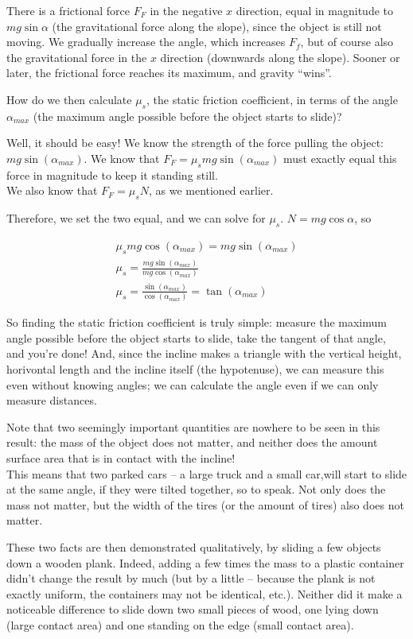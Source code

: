 \documentclass[12pt,a4paper]{report}
\begin{document}
There is a frictional force $F_F$ in the negative $x$ direction, equal in magnitude to $m g \sin \alpha$ (the gravitational force along the slope), since the object is still not moving. We gradually increase the angle, which increases $F_f$, but of course also the gravitational force in the $x$ direction (downwards along the slope). Sooner or later, the frictional force reaches its maximum, and gravity ``wins''.

How do we then calculate $\mu_s$, the static friction coefficient, in terms of the angle $\alpha_{max}$ (the maximum angle possible before the object starts to slide)?

Well, it should be easy! We know the strength of the force pulling the object: $m g \sin (\alpha_{max})$. We know that $F_F = \mu_s m g \sin (\alpha_{max})$ must exactly equal this force in magnitude to keep it standing still.\\
We also know that $F_F = \mu_s N$, as we mentioned earlier.

Therefore, we set the two equal, and we can solve for $\mu_s$. $N = m g \cos \alpha$, so

\begin{align}
\mu_s m g \cos (\alpha_{max}) = m g \sin(\alpha_{max})\\
\mu_s = \frac{m g \sin(\alpha_{max})}{m g \cos (\alpha_{max})}\\
\mu_s = \frac{\sin(\alpha_{max})}{\cos (\alpha_{max})} = \tan(\alpha_{max})
\end{align}

So finding the static friction coefficient is truly simple: measure the maximum angle possible before the object starts to slide, take the tangent of that angle, and you're done! And, since the incline makes a triangle with the vertical height, horivontal length and the incline itself (the hypotenuse), we can measure this even without knowing angles; we can calculate the angle even if we can only measure distances.

Note that two seemingly important quantities are nowhere to be seen in this result: the mass of the object does not matter, and neither does the amount surface area that is in contact with the incline!\\
This means that two parked cars -- a large truck and a small car,will start to slide at the same angle, if they were tilted together, so to speak. Not only does the mass not matter, but the width of the tires (or the amount of tires) also does not matter.

These two facts are then demonstrated qualitatively, by sliding a few objects down a wooden plank. Indeed, adding a few times the mass to a plastic container didn't change the result by much (but by a little -- because the plank is not exactly uniform, the containers may not be identical, etc.). Neither did it make a noticeable difference to slide down two small pieces of wood, one lying down (large contact area) and one standing on the edge (small contact area).
\end{document}
